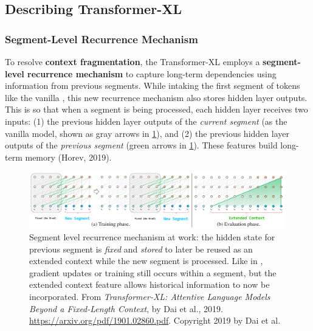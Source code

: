 \subsection{Describing Transformer-XL} \label{sec:DescribingTransformerXL}

\subsubsection{Segment-Level Recurrence Mechanism} \label{sec:SegmentLevelRec}

To resolve \textbf{context fragmentation}, the Transformer-XL employs a \textbf{segment-level recurrence mechanism} to capture long-term dependencies using information from previous segments. While intaking the first segment of tokens like the vanilla , this new recurrence mechanism also stores hidden layer outputs. This is so that when a segment is being processed, each hidden layer receives two inputs: (1) the previous hidden layer outputs of the \emph{current segment} (as the vanilla model, shown as gray arrows in \cref{fig:transXL_extendedContext}), and (2) the previous hidden layer outputs of the \emph{previous segment} (green arrows in \cref{fig:transXL_extendedContext}). These features build long-term memory (Horev, 2019). 

\begin{figure}[h]
\vspace{-5pt}
\centering
\includegraphics[width=0.99\textwidth]{imgs/transXL_extendedcontext.png}
\vspace{-5pt}
\caption{\footnotesize Segment level recurrence mechanism at work: the hidden state for previous segment is \emph{fixed} and \emph{stored} to later be reused as an extended context while the new segment is processed. Like in , gradient updates or training still occurs within a segment, but the extended context feature allows historical information to now be incorporated. From \emph{Transformer-XL: Attentive Language Models Beyond a Fixed-Length Context}, by Dai et al., 2019. \url{https://arxiv.org/pdf/1901.02860.pdf}. Copyright 2019 by Dai et al.}
\vspace{-5pt}
\label{fig:transXL_extendedContext}
\end{figure}


